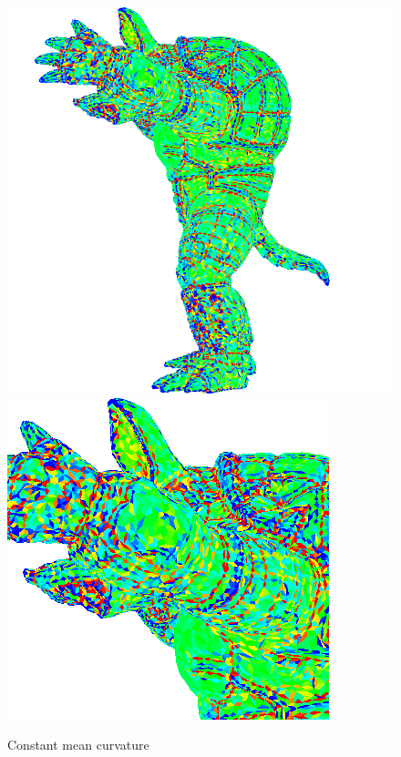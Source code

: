 \begin{figure}[!h]
    \centering
    \centering
    \includegraphics[scale=0.5]{images/mean-curvature-edge.png}
    \endminipage\hfill
    \centering
    \includegraphics[scale=1.0]{images/mean-curvature-edge-detail.png}
    \endminipage
    \caption{Constant mean curvature} \label{fig:armadillo-mean-edge}
\end{figure}

